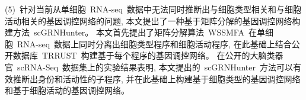 \begin{abstractcn}
(5)~针对当前从单细胞~RNA-seq~数据中无法同时推断出与细胞类型相关和与细胞活动相关的基因调控网络的问题,
本文提出了一种基于矩阵分解的基因调控网络构建方法~scGRNHunter。
本文首先提出了矩阵分解算法~WSSMFA~在单细胞~RNA-seq~数据上同时分离出细胞类型程序和细胞活动程序,
在此基础上结合公开数据库~TRRUST~构建基于每个程序的基因调控网络。
在公开的大脑类器官~scRNA-Seq~数据集上的实验结果表明,
本文提出的~scGRNHunter~方法可以有效推断出身份和活动性的子程序, 
并在此基础上构建基于细胞类型的基因调控网络和基于细胞活动的基因调控网络。

\end{abstractcn}